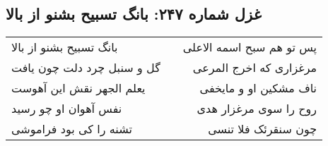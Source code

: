 \begin{center}
\section*{غزل شماره ۲۴۷: بانگ تسبیح بشنو از بالا}
\label{sec:0247}
\begin{longtable}{l p{0.5cm} r}
بانگ تسبیح بشنو از بالا
&&
پس تو هم سبح اسمه الاعلی
\\
گل و سنبل چرد دلت چون یافت
&&
مرغزاری که اخرج المرعی
\\
یعلم الجهر نقش این آهوست
&&
ناف مشکین او و مایخفی
\\
نفس آهوان او چو رسید
&&
روح را سوی مرغزار هدی
\\
تشنه را کی بود فراموشی
&&
چون سنقرئک فلا تنسی
\\
\end{longtable}
\end{center}
